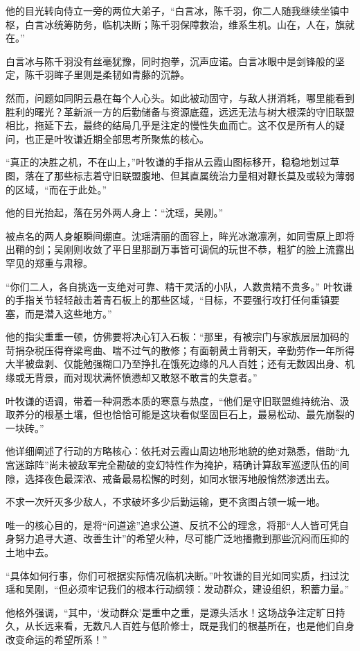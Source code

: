 他的目光转向侍立一旁的两位大弟子，“白言冰，陈千羽，你二人随我继续坐镇中枢，白言冰统筹防务，临机决断；陈千羽保障救治，维系生机。山在，人在，旗就在。”

白言冰与陈千羽没有丝毫犹豫，同时抱拳，沉声应诺。白言冰眼中是剑锋般的坚定，陈千羽眸子里则是柔韧如青藤的沉静。

然而，问题如同阴云悬在每个人心头。如此被动固守，与敌人拼消耗，哪里能看到胜利的曙光？革新派一方的后勤储备与资源底蕴，远远无法与树大根深的守旧联盟相比，拖延下去，最终的结局几乎是注定的慢性失血而亡。这不仅是所有人的疑问，也正是叶牧谦近期全部思考所聚焦的核心。

“真正的决胜之机，不在山上，”叶牧谦的手指从云霞山图标移开，稳稳地划过草图，落在了那些标志着守旧联盟腹地、但其直属统治力量相对鞭长莫及或较为薄弱的区域，“而在于此处。”

他的目光抬起，落在另外两人身上：“沈瑶，吴刚。”

被点名的两人身躯瞬间绷直。沈瑶清丽的面容上，眸光冰澈凛冽，如同雪原上即将出鞘的剑；吴刚则收敛了平日里那副万事皆可调侃的玩世不恭，粗犷的脸上流露出罕见的郑重与肃穆。

“你们二人，各自挑选一支绝对可靠、精干灵活的小队，人数贵精不贵多。” 叶牧谦的手指关节轻轻敲击着青石板上的那些区域，“目标，不要强行攻打任何重镇要塞，而是潜入这些地方。”

他的指尖重重一顿，仿佛要将决心钉入石板：“那里，有被宗门与家族层层加码的苛捐杂税压得脊梁弯曲、喘不过气的散修；有面朝黄土背朝天，辛勤劳作一年所得大半被盘剥、仅能勉强糊口乃至挣扎在饿死边缘的凡人百姓；还有无数因出身、机缘或无背景，而对现状满怀愤懑却又敢怒不敢言的失意者。”

叶牧谦的语调，带着一种洞悉本质的寒意与热度，“他们是守旧联盟维持统治、汲取养分的根基土壤，但也恰恰可能是这块看似坚固巨石上，最易松动、最先崩裂的一块砖。”

他详细阐述了行动的方略核心：依托对云霞山周边地形地貌的绝对熟悉，借助“九宫迷踪阵”尚未被敌军完全勘破的变幻特性作为掩护，精确计算敌军巡逻队伍的间隙，选择夜色最深浓、戒备最易松懈的时刻，如同水银泻地般悄然渗透出去。

不求一次歼灭多少敌人，不求破坏多少后勤运输，更不贪图占领一城一地。

唯一的核心目的，是将“问道途”追求公道、反抗不公的理念，将那“人人皆可凭自身努力追寻大道、改善生计”的希望火种，尽可能广泛地播撒到那些沉闷而压抑的土地中去。

“具体如何行事，你们可根据实际情况临机决断。”叶牧谦的目光如同实质，扫过沈瑶和吴刚，“但必须牢记我们的根本行动纲领：发动群众，建设组织，积蓄力量。”

他格外强调，“其中，‘发动群众’是重中之重，是源头活水！这场战争注定旷日持久，从长远来看，无数凡人百姓与低阶修士，既是我们的根基所在，也是他们自身改变命运的希望所系！”

